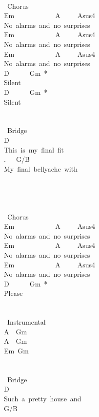 {\\
\lbrack\ Chorus\rbrack\\
Em\ \ \ \ \ \ \ \ \ \ \ \ A\ \ \ \ \ Asus4\\
No\ alarms\ and\ no\ surprises\\
Em\ \ \ \ \ \ \ \ \ \ \ \ A\ \ \ \ \ Asus4\\
No\ alarms\ and\ no\ surprises\\
Em\ \ \ \ \ \ \ \ \ \ \ \ A\ \ \ \ \ Asus4\\
No\ alarms\ and\ no\ surprises\\
D\ \ \ \ \ \ Gm\ *\\
Silent\\
D\ \ \ \ \ \ Gm\ *\\
Silent\\
\\
\\
\lbrack\ Bridge\rbrack\\
D\\
This\ is\ my\ final\ fit\\
.\ \ \ G/B\\
My\ final\ bellyache\ with\\
\\
\\
\\
\\
\lbrack\ Chorus\rbrack\\
Em\ \ \ \ \ \ \ \ \ \ \ \ A\ \ \ \ \ Asus4\\
No\ alarms\ and\ no\ surprises\\
Em\ \ \ \ \ \ \ \ \ \ \ \ A\ \ \ \ \ Asus4\\
No\ alarms\ and\ no\ surprises\\
Em\ \ \ \ \ \ \ \ \ \ \ \ A\ \ \ \ \ Asus4\\
No\ alarms\ and\ no\ surprises\\
D\ \ \ \ \ \ Gm\ *\\
Please\\
\\
\\
\lbrack\ Instrumental\rbrack\\
A\ \ Gm\\
A\ \ Gm\\
Em\ Gm\\
\\
\\
\lbrack\ Bridge\rbrack\\
D\\
Such\ a\ pretty\ house\ and\\
G/B\\
}
